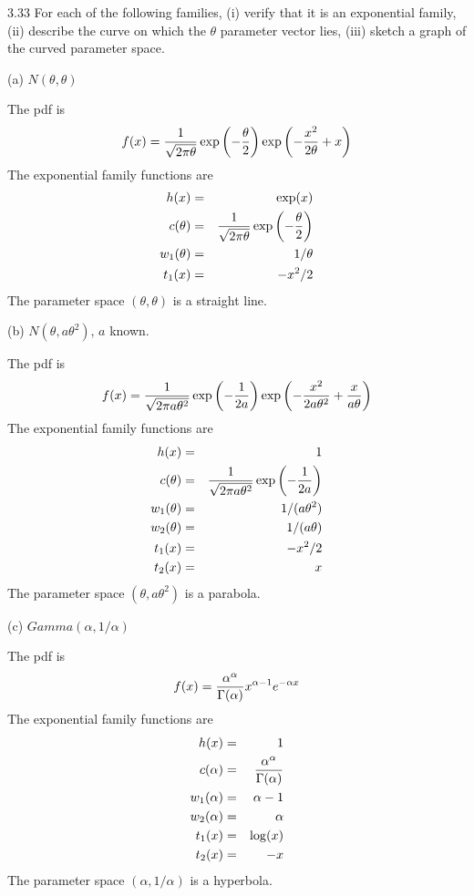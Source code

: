 \documentclass[12pt]{article}
\begin{document}
3.33
For each of the following families, (i) verify that it is an
exponential family, (ii) describe the curve on which the $\theta$
parameter vector lies, (iii) sketch a graph of the curved parameter
space.

\bigskip
\noindent
(a) $N(\theta,\theta)$

\bigskip
\noindent
The pdf is
$$f(x)={1\over\sqrt{2\pi\theta}}
\exp\left(-{\theta\over2}\right)
\exp\left(-{x^2\over2\theta}+x\right)$$
The exponential family functions are
\begin{eqnarray*}
h(x)&=&\exp(x)\\
c(\theta)&=&{1\over\sqrt{2\pi\theta}}
\exp\left(-{\theta\over2}\right)\\
w_1(\theta)&=&1/\theta\\
t_1(x)&=&-x^2/2
\end{eqnarray*}
The parameter space $(\theta,\theta)$ is a straight
line.

\bigskip
\noindent
(b) $N(\theta,a\theta^2)$, $a$ known.

\bigskip
\noindent
The pdf is
$$f(x)={1\over\sqrt{2\pi a\theta^2}}
\exp\left(-{1\over2a}\right)
\exp\left(-{x^2\over2a\theta^2}+{x\over a\theta}\right)$$
The exponential family functions are
\begin{eqnarray*}
h(x)&=&1\\
c(\theta)&=&{1\over\sqrt{2\pi a\theta^2}}
\exp\left(-{1\over2a}\right)\\
w_1(\theta)&=&1/(a\theta^2)\\
w_2(\theta)&=&1/(a\theta)\\
t_1(x)&=&-x^2/2\\
t_2(x)&=&x
\end{eqnarray*}
The parameter space $(\theta,a\theta^2)$ is a
parabola.

\bigskip
\noindent
(c) $Gamma(\alpha,1/\alpha)$

\bigskip
\noindent
The pdf is
$$f(x)={\alpha^\alpha\over\Gamma(\alpha)}
x^{\alpha-1}e^{-\alpha x}$$
The exponential family functions are
\begin{eqnarray*}
h(x)&=&1\\
c(\alpha)&=&{\alpha^\alpha\over\Gamma(\alpha)}\\
w_1(\alpha)&=&\alpha-1\\
w_2(\alpha)&=&\alpha\\
t_1(x)&=&\log(x)\\
t_2(x)&=&-x
\end{eqnarray*}
The parameter space $(\alpha,1/\alpha)$ is
a hyperbola.
\end{document}
